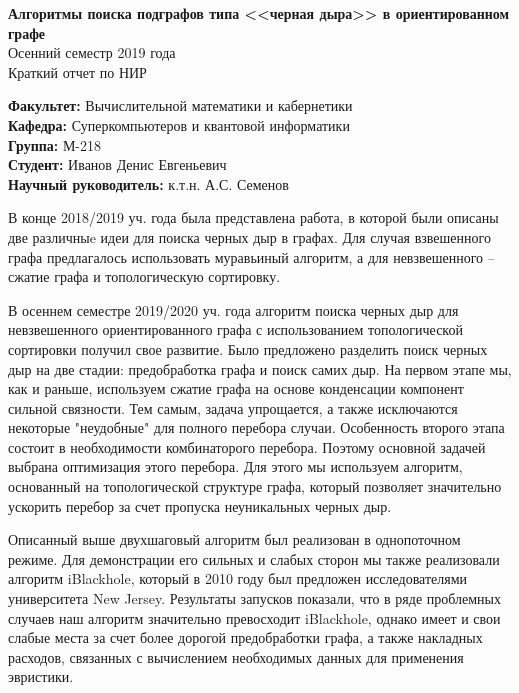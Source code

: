\documentclass[12pt,a4paper]{scrartcl}
\begin{document}
\Large

\begin{center}
\textbf{Алгоритмы поиска подграфов типа <<черная дыра>> в ориентированном графе}\\
	Осенний семестр 2019 года \\
Краткий отчет по НИР 
\end{center}

\hfill\begin{minipage}{0.6\textwidth}
    \normalsize
    \textbf{Факультет:} Вычислительной математики и кабернетики \\
    \textbf{Кафедра:} Суперкомпьютеров и квантовой информатики \\
    \textbf{Группа:} М-218 \\
    \textbf{Студент:} Иванов Денис Евгеньевич \\
    \textbf{Научный руководитель:} к.т.н. А.С. Семенов \\
\end{minipage}
\vfill

\normalsize
В конце 2018/2019 уч. года была представлена работа, в которой были описаны две различныe идеи для
поиска черных дыр в графах. Для случая взвешенного графа предлагалось использовать муравьиный алгоритм, а для невзвешенного -- сжатие графа и топологическую сортировку.

В осеннем семестре 2019/2020 уч. года алгоритм поиска черных дыр для невзвешенного ориентированного графа с использованием топологической сортировки получил свое развитие. Было предложено разделить поиск черных дыр на две стадии: предобработка графа и поиск самих дыр.
На первом этапе мы, как и раньше, используем сжатие графа на основе конденсации компонент сильной связности.
Тем самым, задача упрощается, а также исключаются некоторые "неудобные" для полного перебора случаи.
Особенность второго этапа состоит в необходимости комбинаторого перебора. Поэтому основной задачей выбрана оптимизация этого перебора.
Для этого мы используем алгоритм, основанный на топологической структуре графа, который позволяет
значительно ускорить перебор за счет пропуска неуникальных черных дыр.

Описанный выше двухшаговый алгоритм был реализован в однопоточном режиме.
Для демонстрации его сильных и слабых сторон мы также реализовали алгоритм iBlackhole, который в 2010 году был
предложен исследователями университета New Jersey. Результаты запусков показали, что в ряде проблемных 
случаев наш алгоритм значительно превосходит iBlackhole, однако имеет и свои слабые места за счет более дорогой предобработки графа,
а также накладных расходов, связанных с вычислением необходимых данных для применения эвристики.
\end{document}
